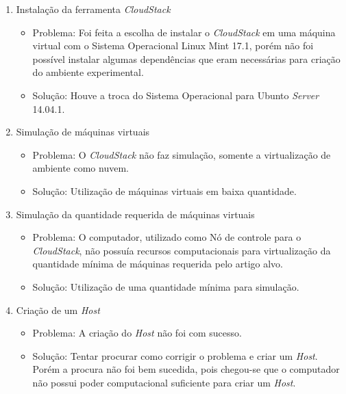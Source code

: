   \begin{enumerate}

    \item Instalação da ferramenta \textit{CloudStack}

    \begin{itemize}
      \item Problema: Foi feita a escolha de instalar o \textit{CloudStack} em uma máquina virtual com o Sistema Operacional Linux Mint 17.1, porém não foi possível instalar algumas dependências que eram necessárias para criação do ambiente experimental.
      \item Solução: Houve a troca do Sistema Operacional para Ubunto \textit{Server} 14.04.1.
    \end{itemize}

    \item Simulação de máquinas virtuais
    \begin{itemize}
      \item Problema: O \textit{CloudStack} não faz simulação, somente a virtualização de ambiente como nuvem.
      \item Solução: Utilização de máquinas virtuais em baixa quantidade.
    \end{itemize}

    \item Simulação da quantidade requerida de máquinas virtuais
    \begin{itemize}
      \item Problema: O computador, utilizado como Nó de controle para o \textit{CloudStack}, não possuía recursos computacionais para virtualização da quantidade mínima de máquinas requerida pelo artigo alvo.
      \item Solução: Utilização de uma quantidade mínima para simulação.
    \end{itemize}

    \item Criação de um \textit{Host}
    \begin{itemize}
      \item Problema: A criação do \textit{Host} não foi com sucesso.
      \item Solução: Tentar procurar como corrigir o problema e criar um \textit{Host}. Porém a procura não foi bem sucedida, pois chegou-se que o computador não possui poder computacional suficiente para criar um \textit{Host}.
    \end{itemize}

  \end{enumerate}


 \begin{comment}

  \item Instalação da ferramenta \textit{CloudStack}
  \begin{itemize}
    \item Problema:
    \item Solução:
  \end{itemize}


\end{comment}
